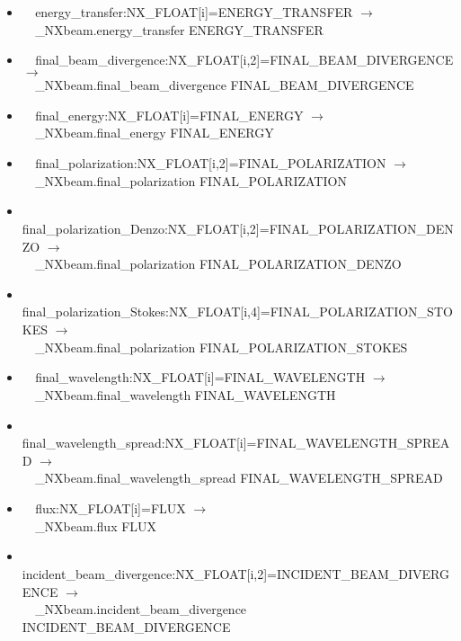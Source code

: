 \documentclass[11pt]{article}
\begin{document}
{{\begin{itemize}
\item{\verb|  |energy\_transfer:NX\_FLOAT[i]=ENERGY\_TRANSFER $\rightarrow$\\
\verb|  |\_NXbeam.energy\_transfer ENERGY\_TRANSFER}

\item{\verb|  |final\_beam\_divergence:NX\_FLOAT[i,2]=FINAL\_BEAM\_DIVERGENCE $\rightarrow$\\
\verb|  |\_NXbeam.final\_beam\_divergence FINAL\_BEAM\_DIVERGENCE}

\item{\verb|  |final\_energy:NX\_FLOAT[i]=FINAL\_ENERGY $\rightarrow$\\
\verb|  |\_NXbeam.final\_energy FINAL\_ENERGY}

\item{\verb|  |final\_polarization:NX\_FLOAT[i,2]=FINAL\_POLARIZATION $\rightarrow$\\
\verb|  |\_NXbeam.final\_polarization FINAL\_POLARIZATION}

\item{\verb|  |final\_polarization\_Denzo:NX\_FLOAT[i,2]=FINAL\_POLARIZATION\_DENZO $\rightarrow$\\
\verb|  |\_NXbeam.final\_polarization FINAL\_POLARIZATION\_DENZO}

\item{\verb|  |final\_polarization\_Stokes:NX\_FLOAT[i,4]=FINAL\_POLARIZATION\_STOKES $\rightarrow$\\
\verb|  |\_NXbeam.final\_polarization FINAL\_POLARIZATION\_STOKES}

\item{\verb|  |final\_wavelength:NX\_FLOAT[i]=FINAL\_WAVELENGTH $\rightarrow$\\
\verb|  |\_NXbeam.final\_wavelength FINAL\_WAVELENGTH}

\item{\verb|  |final\_wavelength\_spread:NX\_FLOAT[i]=FINAL\_WAVELENGTH\_SPREAD $\rightarrow$\\
\verb|  |\_NXbeam.final\_wavelength\_spread FINAL\_WAVELENGTH\_SPREAD}

\item{\verb|  |flux:NX\_FLOAT[i]=FLUX $\rightarrow$\\
\verb|  |\_NXbeam.flux FLUX}

\item{\verb|  |incident\_beam\_divergence:NX\_FLOAT[i,2]=INCIDENT\_BEAM\_DIVERGENCE $\rightarrow$\\
\verb|  |\_NXbeam.incident\_beam\_divergence INCIDENT\_BEAM\_DIVERGENCE}


\end{itemize}}}
\end{document}
